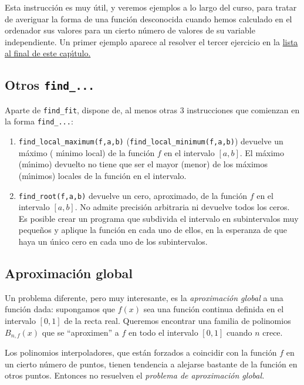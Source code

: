 Esta instrucci\'on es muy \'util, y veremos ejemplos a lo largo del curso, para
tratar de averiguar la forma de una  funci\'on desconocida cuando hemos
calculado en el ordenador sus valores para un cierto n\'umero de valores de su
variable independiente. Un primer ejemplo aparece al resolver el tercer
ejercicio en la \hyperref[ejer-7]{lista al final de este cap\'{\i}tulo.} 

\subsection{Otros {\tt find\_...}}

Aparte de {\tt find\_fit}, {\sage} dispone de, al menos otras $3$ instrucciones
que comienzan en la forma {\tt find\_...}:

\begin{enumerate}
 \item {\tt find\_local\_maximum(f,a,b)} ({\tt find\_local\_minimum(f,a,b)})
devuelve un m\'aximo ( m\'{\i}nimo local) de la funci\'on $f$ en el intervalo
$[a,b]$. El m\'aximo (m\'{\i}nimo) devuelto no tiene que ser el mayor (menor)
de los m\'aximos (m\'{\i}nimos) locales de la funci\'on en el intervalo.
 
 
 \item {\tt find\_root(f,a,b)} devuelve un cero, aproximado,  de la funci\'on
$f$ en el intervalo $[a,b]$. No admite precisi\'on arbitraria ni devuelve todos
los ceros. Es posible crear un programa que subdivida el intervalo  en
subintervalos muy peque\~nos y aplique la funci\'on en cada uno de ellos, en la
esperanza de que haya un \'unico cero en cada uno de los subintervalos.
 
 
 
 
\end{enumerate}




\subsection{Aproximaci\'on global}

Un problema diferente, pero muy interesante, es la {\itshape aproximaci\'on
global} a una funci\'on dada: supongamos que $f(x)$ sea una funci\'on continua
definida en el intervalo $[0,1]$ de la recta real. Queremos encontrar una
familia de polinomios $B_{n,f}(x)$ que se ``aproximen'' a $f$ en todo el
intervalo
$[0,1]$ cuando $n$ crece. 

 Los polinomios interpoladores, que est\'an forzados a
coincidir con la funci\'on $f$ en un cierto n\'umero de puntos, tienen
tendencia a alejarse bastante de la funci\'on en otros puntos. Entonces no
resuelven el {\itshape problema de aproximaci\'on global.}



